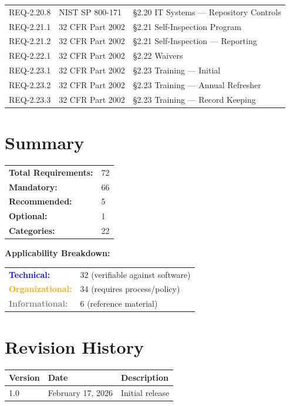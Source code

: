 \documentclass[11pt,letterpaper]{article}
\begin{document}
\begin{longtable}{@{}l l p{8cm}@{}}
REQ-2.20.8 & NIST SP 800-171 & \S2.20 IT Systems --- Repository Controls \\
REQ-2.21.1 & 32 CFR Part 2002 & \S2.21 Self-Inspection Program \\
REQ-2.21.2 & 32 CFR Part 2002 & \S2.21 Self-Inspection --- Reporting \\
REQ-2.22.1 & 32 CFR Part 2002 & \S2.22 Waivers \\
REQ-2.23.1 & 32 CFR Part 2002 & \S2.23 Training --- Initial \\
REQ-2.23.2 & 32 CFR Part 2002 & \S2.23 Training --- Annual Refresher \\
REQ-2.23.3 & 32 CFR Part 2002 & \S2.23 Training --- Record Keeping \\
\bottomrule
\end{longtable}

\section{Summary}

\begin{tabular}{@{}ll@{}}
\textbf{Total Requirements:} & 72 \\
\textbf{Mandatory:} & 66 \\
\textbf{Recommended:} & 5 \\
\textbf{Optional:} & 1 \\
\textbf{Categories:} & 22 \\
\end{tabular}

\vspace{12pt}
\textbf{Applicability Breakdown:}

\begin{tabular}{@{}ll@{}}
\textcolor{blue}{\textbf{Technical:}} & 32 (verifiable against software) \\
\textcolor{orange}{\textbf{Organizational:}} & 34 (requires process/policy) \\
\textcolor{gray}{\textbf{Informational:}} & 6 (reference material) \\
\end{tabular}

\section{Revision History}

\begin{tabularx}{\textwidth}{llX}
\toprule
\textbf{Version} & \textbf{Date} & \textbf{Description} \\
\midrule
1.0 & February 17, 2026 & Initial release \\
\bottomrule
\end{tabularx}
\end{document}
